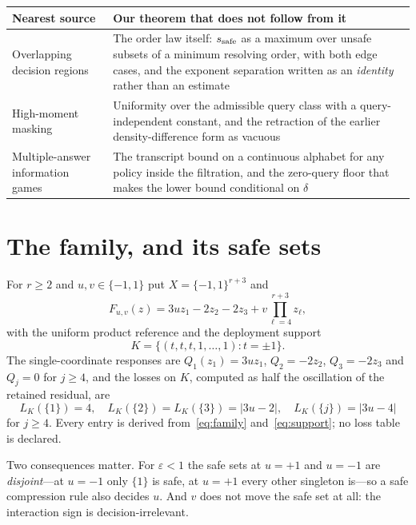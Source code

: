 \begin{table}[h]
\centering
\footnotesize
\begin{tabular}{@{}p{}p{}@{}}
\toprule
Nearest source & Our theorem that does not follow from it \\
\midrule
Overlapping decision regions & The order law itself: $s_{\rm safe}$ as a maximum over unsafe
subsets of a minimum resolving order, with both edge cases, and the exponent separation
written as an \emph{identity} rather than an estimate \\
High-moment masking & Uniformity over the admissible query class with a query-independent
constant, and the retraction of the earlier density-difference form as vacuous \\
Multiple-answer information games & The transcript bound on a continuous alphabet for any
policy inside the filtration, and the zero-query floor that makes the lower bound conditional
on $\delta$ \\
\bottomrule
\end{tabular}
\end{table}

\section{The family, and its safe sets}
\label{sec:family}

For $r\ge2$ and $u,v\in\{-1,1\}$ put $X=\{-1,1\}^{r+3}$ and
\begin{equation}
F_{u,v}(z)=3u z_{1}-2z_{2}-2z_{3}+v\prod_{\ell=4}^{r+3}z_{\ell},
\label{eq:family}
\end{equation}
with the uniform product reference and the deployment support
\begin{equation}
K=\bigl\{(t,t,t,1,\dots,1):t=\pm1\bigr\}.
\label{eq:support}
\end{equation}
The single-coordinate responses are $Q_{1}(z_{1})=3uz_{1}$, $Q_{2}=-2z_{2}$, $Q_{3}=-2z_{3}$
and $Q_{j}=0$ for $j\ge4$, and the losses on $K$, computed as half the oscillation of the
retained residual, are
\begin{equation}
L_{K}(\{1\})=4,\quad L_{K}(\{2\})=L_{K}(\{3\})=|3u-2|,\quad L_{K}(\{j\})=|3u-4|
\label{eq:losses}
\end{equation}
for $j\ge4$. Every entry is derived from~\eqref{eq:family} and~\eqref{eq:support}; no loss
table is declared. \CERT{}

Two consequences matter. For $\varepsilon<1$ the safe sets at $u=+1$ and $u=-1$ are
\emph{disjoint}---at $u=-1$ only $\{1\}$ is safe, at $u=+1$ every other singleton is---so a
safe compression rule also decides $u$. And $v$ does not move the safe set at all: the
interaction sign is decision-irrelevant.

